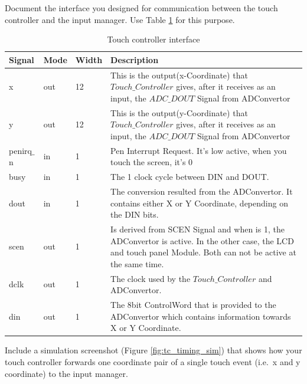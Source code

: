 \documentclass[11pt,a4paper,titlepage,oneside]{article}
\begin{document}
\maketitle


Document the interface you designed for communication between the touch controller and the input manager.
Use Table \ref{tab:tc} for this purpose.

\begin{table}[h!]
	\centering
	\begin{tabular}{|l|l|l| p{}  |}
		\hline
		Signal & Mode & Width & Description \\\hline \hline
		x & out & 12 & This is the output(x-Coordinate) that $ Touch\_Controller $  gives, after it receives  as an input, the $ ADC\_DOUT $ Signal from ADConvertor\\ \hline
		y & out & 12 & This is the output(y-Coordinate) that $ Touch\_Controller $  gives, after it receives  as an input, the $ ADC \_ DOUT $ Signal from ADConvertor \\ \hline
		penirq$ \_ $n   & in & 1 &  Pen Interrupt Request. It's low active, when you touch the screen, it's 0\\ \hline
		busy & in & 1 & The 1 clock cycle between DIN and DOUT.\\ \hline
		dout & in & 1 &  The conversion resulted from the ADConvertor. It contains either X or Y Coordinate, depending on the DIN bits.\\ \hline
		scen & out & 1 & Is derived from SCEN Signal and when is 1, the ADConvertor is active. In the other case, the LCD and touch panel Module. Both can not be active at the same time. \\ \hline
		dclk & out & 1 & The clock used by the $ Touch\_Controller $ and ADConvertor.  \\ \hline
		din   & out & 1 & The 8bit ControlWord that is provided to the ADConvertor which contains information towards X or Y Coordinate. \\ \hline
	\end{tabular}
	\caption{Touch controller interface \label{tab:tc}}
\end{table}

Include a simulation screenshot (Figure \ref{fig:tc_timing_sim}) that shows how your touch controller forwards one coordinate pair of a single touch event (i.e.~x and y coordinate) to the input manager. 
\end{document}
